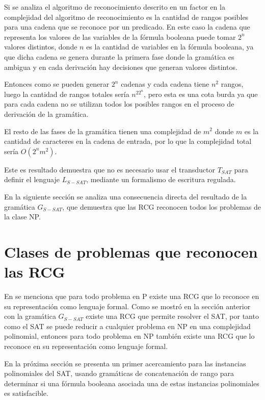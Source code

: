Si se analiza el algoritmo de reconocimiento descrito en \cite{mainRCGBib} un factor en la complejidad del
algoritmo de reconocimiento es la cantidad de rangos posibles para una cadena que se reconoce por un predicado.
En este caso la cadena que representa los valores de las variables de la fórmula booleana puede tomar $2^n$
valores distintos, donde $n$ es la cantidad de variables en la fórmula booleana, ya que dicha cadena se genera
durante la primera fase donde la gramática es ambigua y en cada derivación hay decisiones que generan valores
distintos.

Entonces como se pueden generar $2^n$ cadenas y cada cadena tiene $n^2$ rangos, luego la cantidad
de rangos totales sería $n^22^n$, pero esta es una cota burda ya que para cada cadena no se utilizan todos los
posibles rangos en el proceso de derivación de la gramática.

El resto de las fases de la gramática tienen una complejidad de $m^2$ donde $m$ es la cantidad de caracteres
en la cadena de entrada, por lo que la complejidad total sería $O(2^nm^2)$.

Este es resultado demuestra que no es necesario usar el transductor $T_{SAT}$ para definir el lenguaje
$L_{S-SAT}$, mediante un formalismo de escritura regulada.

En la siguiente sección se analiza una consecuencia directa del resultado de la gramática $G_{S-SAT}$, que demuestra
que las RCG reconocen todos los problemas de la clase NP.

\section{Clases de problemas que reconocen las RCG}

En \cite{propertiesRCGBib2} se menciona que para todo problema en P existe una RCG que lo reconoce en su
representación como lenguaje formal. Como se mostró en la sección anterior con la gramática $G_{S-SAT}$ existe
una RCG que permite resolver el SAT, por tanto como el SAT se puede reducir a cualquier problema en NP en una
complejidad polinomial, entonces para todo problema en NP también existe una RCG que lo reconoce en su
representación como lenguaje formal.

En la próxima sección se presenta un primer acercamiento para las instancias polinomiales del SAT, usando gramáticas de concatenación de rango
para determinar si una fórmula booleana asociada una de estas instancias polinomiales es satisfacible.

